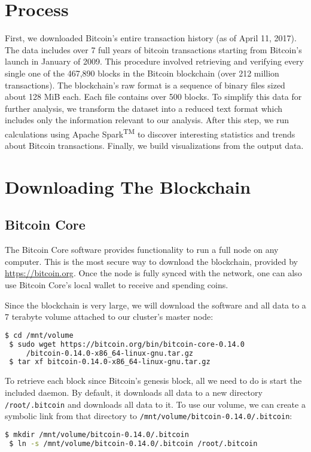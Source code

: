\documentclass[9pt,twocolumn,twoside]{idsi}
\begin{document}
\section{Process}
First, we downloaded Bitcoin's entire transaction history (as of April 11, 2017). The data includes over 7 full years of bitcoin transactions starting from Bitcoin's launch in January of 2009. This procedure involved retrieving and verifying every single one of the 467,890 blocks in the Bitcoin blockchain (over 212 million transactions). The blockchain's raw format is a sequence of binary files sized about 128 MiB each. Each file contains over 500 blocks. To simplify this data for further analysis, we transform the dataset into a reduced text format which includes only the information relevant to our analysis. After this step, we run calculations using Apache Spark\textsuperscript{TM} to discover interesting statistics and trends about Bitcoin transactions. Finally, we build visualizations from the output data.

\section{Downloading The Blockchain}
\subsection{Bitcoin Core}
The Bitcoin Core software provides functionality to run a full node on any computer. This is the most secure way to download the blockchain, provided by \href{https://bitcoin.org}{https://bitcoin.org}. Once the node is fully synced with the network, one can also use Bitcoin Core's local wallet to receive and spending coins.

Since the blockchain is very large, we will download the software and all data to a 7 terabyte volume attached to our cluster's master node:
\begin{lstlisting}[language=bash]
 $ cd /mnt/volume
 $ sudo wget https://bitcoin.org/bin/bitcoin-core-0.14.0
     /bitcoin-0.14.0-x86_64-linux-gnu.tar.gz
 $ tar xf bitcoin-0.14.0-x86_64-linux-gnu.tar.gz
\end{lstlisting}

To retrieve each block since Bitcoin's genesis block, all we need to do is start the included daemon. By default, it downloads all data to a new directory \lstinline{/root/.bitcoin} and downloads all data to it. To use our volume, we can create a symbolic link from that directory to \lstinline{/mnt/volume/bitcoin-0.14.0/.bitcoin}:
\begin{lstlisting}[language=bash]
 $ mkdir /mnt/volume/bitcoin-0.14.0/.bitcoin
 $ ln -s /mnt/volume/bitcoin-0.14.0/.bitcoin /root/.bitcoin
\end{lstlisting}
\end{document}

